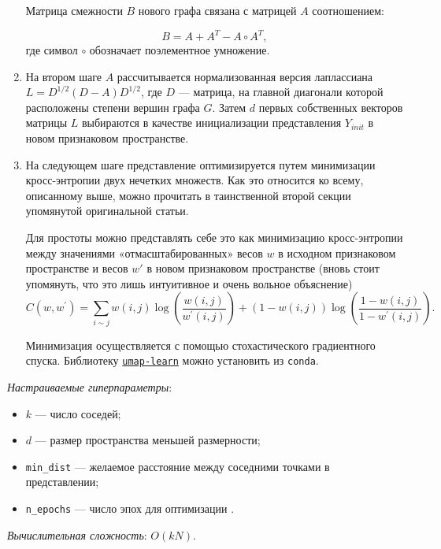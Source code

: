 \documentclass[10pt, a4paper]{extarticle}
\newcommand{\code}[1]{\texttt{#1}}
\begin{document}
\begin{enumerate}
Матрица смежности $B$ нового графа связана с матрицей $A$ соотношением:

\[
B = A + A^T - A \circ A^T,
\] 
где символ $\circ$ обозначает поэлементное умножение.


\item На втором шаге $A$ рассчитывается нормализованная версия лаплассиана $L = D^{1/2}(D - A)D^{1/2}$, где $D$ — матрица, на главной диагонали которой расположены степени вершин графа $G$. Затем  $d$ первых собственных векторов матрицы $L$ выбираются в качестве инициализации представления $Y_{init}$ в новом признаковом пространстве.


\item
На следующем шаге представление оптимизируется путем минимизации кросс-энтропии двух нечетких множеств. 
Как это относится ко всему, описанному выше, можно прочитать в таинственной второй секции упомянутой оригинальной статьи.

Для простоты можно представлять себе это как минимизацию кросс-энтропии между значениями «отмасштабированных» весов $w$ в исходном признаковом пространстве и весов $w'$ в новом признаковом пространстве (вновь стоит упомянуть, что это лишь интуитивное и очень вольное объяснение)
\[
C\left(w, w^{\prime}\right)=\sum_{i \sim j} w(i, j) \log \left(\frac{w(i, j)}{w^{\prime}(i, j)}\right)+(1-w(i, j)) \log \left(\frac{1-w(i, j)}{1-w^{\prime}(i, j)}\right). 
\]

Минимизация осуществляется с помощью стохастического градиентного спуска. Библиотеку \href{https://umap-learn.readthedocs.io/en/latest/#}{\code{umap-learn}} можно установить из \code{conda}.

\end{enumerate}

\textit{Настраиваемые гиперпараметры}:

\begin{itemize}
	\item $k$ — число соседей;
	\item $d$ — размер пространства меньшей размерности;
	\item \code{min\_dist} — желаемое расстояние между соседними точками в представлении;
	\item \code{n\_epochs} — число эпох для оптимизации .
\end{itemize}

\textit{Вычислительная сложность}: $O(kN)$.
\end{document}
